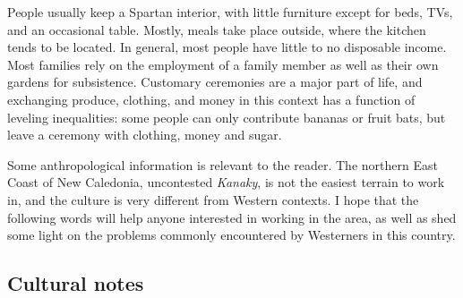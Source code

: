 People usually keep a Spartan interior, with little furniture except for beds, TVs, and an occasional table. Mostly, meals take place outside, where the kitchen tends to be located. In general, most people have little to no disposable income. Most families rely on the employment of a family member as well as their own gardens for subsistence. Customary ceremonies are a major part of life, and exchanging produce, clothing, and money in this context has a function of leveling inequalities: some people can only contribute bananas or fruit bats, but leave a ceremony with clothing, money and sugar. %



Some anthropological information is relevant to the reader. The northern East Coast of New Caledonia, uncontested \textit{Kanaky}, is not the easiest terrain to work in, and the culture is very different from Western contexts. I hope that the following words will help anyone interested in working in the area, as well as shed some light on the problems commonly encountered by Westerners in this country.

\subsection{Cultural notes}\largerpage
\label{ssec:Soc}

